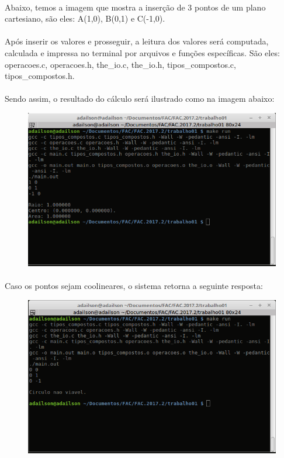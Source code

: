 \documentclass[a4paper, 12pt]{article}
\begin{document}
        \paragraph{}	Abaixo, temos a imagem que mostra a inser\c{c}\~ao de 3 pontos de um plano cartesiano, s\~ao eles: A(1,0), B(0,1) e C(-1,0). 
        \paragraph{}	Ap\'os inserir os valores e prosseguir, a leitura dos valores ser\'a computada, calculada e impressa no terminal por arquivos e fun\c{c}\~oes espec\'ificas. S\~ao eles: operacoes.c, operacoes.h, the\_io.c, the\_io.h, tipos\_compostos.c, tipos\_compostos.h. 
        \paragraph{}	Sendo assim, o resultado do c\'alculo ser\'a ilustrado como na imagem abaixo:
        \begin{figure}[H]
        	\centering
			\includegraphics[scale=0.5]{img1.png}
		\end{figure}
		 \paragraph{}	Caso os pontos sejam coolineares, o sistema retorna a seguinte resposta:
		 \begin{figure}[H]
        	\centering
			\includegraphics[scale=0.5]{img3.png}
		\end{figure}
\end{document}
